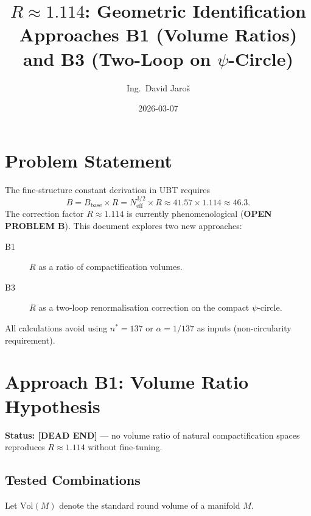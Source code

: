\documentclass[11pt,a4paper]{article}
\title{$R \approx 1.114$: Geometric Identification\\
    \large Approaches B1 (Volume Ratios) and B3 (Two-Loop on $\psi$-Circle)}
\author{Ing.\ David Jaroš}
\date{2026-03-07}
\theoremstyle{remark}
\begin{document}
  \maketitle
\fi

\section{Problem Statement}
\label{sec:r_problem}

The fine-structure constant derivation in UBT requires
\begin{equation}
  B = B_{\mathrm{base}} \times R
    = N_{\mathrm{eff}}^{3/2} \times R
    \approx 41.57 \times 1.114
    \approx 46.3.
\end{equation}
The correction factor $R \approx 1.114$ is currently phenomenological
(\textbf{OPEN PROBLEM B}).  This document explores two new approaches:

\begin{description}
  \item[B1] $R$ as a ratio of compactification volumes.
  \item[B3] $R$ as a two-loop renormalisation correction on the compact $\psi$-circle.
\end{description}

All calculations avoid using $n^* = 137$ or $\alpha = 1/137$ as inputs
(non-circularity requirement).

\section{Approach B1: Volume Ratio Hypothesis}
\label{sec:B1_volume}

\textbf{Status: [DEAD END]} — no volume ratio of natural compactification
spaces reproduces $R \approx 1.114$ without fine-tuning.

\subsection{Tested Combinations}

Let $\mathrm{Vol}(M)$ denote the standard round volume of a manifold $M$.
\end{document}
